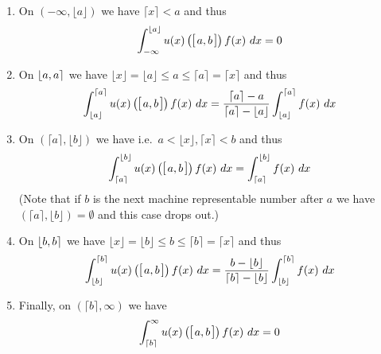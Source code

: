 \documentclass[10pt,a4paper]{article}
\theoremstyle{plain}
\theoremstyle{definition}
\newcommand{\ceil}[1]{\lceil #1 \rceil}
\newcommand{\floor}[1]{\lfloor #1 \rfloor}
\newcommand{\intvl}[1]{\mathlarger{\left[\right.}  #1 \mathlarger{\left.\right]}}
\newcommand{\fintvl}[1][x]{\mathlarger{\lfloor}#1,#1\mathlarger{\rceil}}
\begin{document}
\begin{enumerate}
\item On $\left(-\infty,\floor{a}\right)$ we have $\ceil{x}<a$ and thus
\[
\int_{-\infty}^{\floor{a}} u(x)\left(\intvl{a,b}\right) f(x) ~dx=0
\]
\item On $\fintvl[a]$ we have $\floor{x}=\floor{a}\leq a\leq \ceil{a}=\ceil{x}$ and thus
\[
\int_{\floor{a}}^{\ceil{a}} u(x)\left(\intvl{a,b}\right) f(x) ~dx=\frac{\ceil{a}-a}{\ceil{a}-\floor{a}}\int_{\floor{a}}^{\ceil{a}}  f(x) ~dx
\]
\item On $\left(\ceil{a},\floor{b}\right)$ we have  i.e.\ $a<\floor{x}, \ceil{x}<b$ and thus
\[
\int_{\ceil{a}}^{\floor{b}} u(x)\left(\intvl{a,b}\right) f(x) ~dx=\int_{\ceil{a}}^{\floor{b}} f(x)~dx
\]
(Note that if $b$ is the next machine representable number after $a$ we have $\left(\ceil{a},\floor{b}\right)=\emptyset$ and this case drops out.)
\item On $\fintvl[b]$ we have $\floor{x}=\floor{b}\leq b\leq \ceil{b}=\ceil{x}$ and thus
\[
\int_{\floor{b}}^{\ceil{b}} u(x)\left(\intvl{a,b}\right) f(x) ~dx=\frac{b-\floor{b}}{\ceil{b}-\floor{b}}\int_{\floor{b}}^{\ceil{b}}  f(x) ~dx
\]
\item Finally, on $\left(\ceil{b},\infty\right)$ we have
\[
\int_{\ceil{b}}^{\infty} u(x)\left(\intvl{a,b}\right) f(x) ~dx=0
\]
\end{enumerate}
\end{document}

